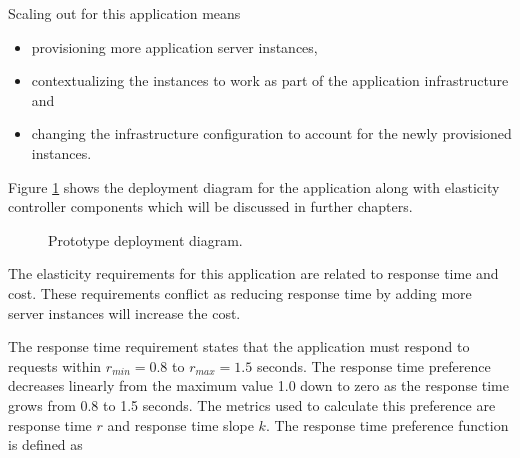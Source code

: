 \documentclass[english]{tktltiki2}
\theoremstyle{definition}
\theoremstyle{remark}
\begin{document}
Scaling out for this application means  

\begin{itemize}
	\item{provisioning more application server instances,}
	\item{contextualizing the instances to work as part of the application 
	infrastructure and}
	\item{changing the infrastructure configuration to account for the newly 
	provisioned instances.}
\end{itemize}

Figure \ref{fig:deploymentDiagram} shows the deployment diagram for the
application along with elasticity controller components which will be discussed
in further chapters.

\begin{figure}[h]
	\caption{Prototype deployment diagram.}
	\label{fig:deploymentDiagram}
\end{figure}

The elasticity requirements for this application are related to response time
and cost. These requirements conflict as reducing response time by adding more
server instances will increase the cost.

The response time requirement states that the application must respond to
requests within $r_{min} = 0.8$ to $r_{max} = 1.5$
seconds. The response time preference decreases linearly from the maximum value
1.0 down to zero as the response time grows from 0.8 to 1.5 seconds. The metrics used to calculate this preference are response time $r$ and response
time slope $k$. The response time preference function is defined as  
\end{document}
